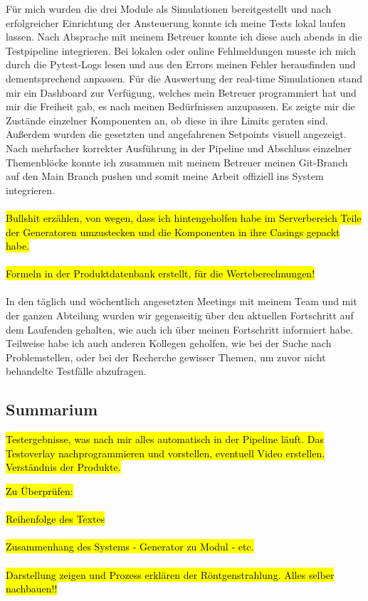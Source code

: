 \documentclass[12pt]{article} %
\begin{document}
Für mich wurden die drei Module als Simulationen bereitgestellt und nach erfolgreicher Einrichtung der Ansteuerung konnte ich meine Tests lokal laufen lassen. Nach Absprache mit meinem Betreuer konnte ich diese auch abends in die Testpipeline integrieren. Bei lokalen oder online Fehlmeldungen musste ich mich durch die Pytest-Logs lesen und aus den Errors meinen Fehler herausfinden und dementsprechend anpassen.
Für die Auswertung der real-time Simulationen stand mir ein Dashboard zur Verfügung, welches mein Betreuer programmiert hat und mir die Freiheit gab, es nach meinen Bedürfnissen anzupassen. Es zeigte mir die Zustände einzelner Komponenten an, ob diese in ihre Limits geraten sind. Außerdem wurden die gesetzten und angefahrenen Setpoints visuell angezeigt.
Nach mehrfacher korrekter Ausführung in der Pipeline und Abschluss einzelner Themenblöcke konnte ich zusammen mit meinem Betreuer meinen Git-Branch auf den Main Branch pushen und somit meine Arbeit offiziell ins System integrieren.
\\
\\
\hl{Bullshit erzählen, von wegen, dass ich hintengeholfen habe im Serverbereich Teile der Generatoren umzustecken und die Komponenten in ihre Casings gepackt habe.\\ \\ Formeln in der Produktdatenbank erstellt, für die Werteberechnungen!}
\\
\\
In den täglich und wöchentlich angesetzten Meetings mit meinem Team und mit der ganzen Abteilung wurden wir gegenseitig über den aktuellen Fortschritt auf dem Laufenden gehalten, wie auch ich über meinen Fortschritt informiert habe.
Teilweise habe ich auch anderen Kollegen geholfen, wie bei der Suche nach Problemstellen, oder bei der Recherche gewisser Themen, um zuvor nicht behandelte Testfälle abzufragen. 

\subsection{Summarium}
\hl{Testergebnisse, was nach mir alles automatisch in der Pipeline läuft.
Das Testoverlay nachprogrammieren und vorstellen, eventuell Video erstellen.
Verständnis der Produkte.}

\hl{Zu Überprüfen:
\\
\\
Reihenfolge des Textes
\\
\\
Zusammenhang des Systems - Generator zu Modul - etc.
\\
\\
Darstellung zeigen und Prozess erklären der Röntgenstrahlung. Alles selber nachbauen!!
\\
\\
}
\newpage
\end{document}

